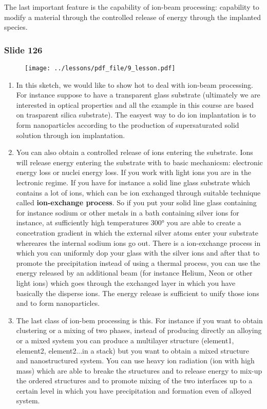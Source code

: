 \documentclass[../main/main.tex]{subfiles}
\begin{document}
The last important feature is the capability of ion-beam processing: capability to modify a material through the controlled release of energy through the implanted species.

\newpage

\subsubsection{Slide 126}

\begin{figure}[h!]
\centering
\texttt{[image: ../lessons/pdf\_file/9\_lesson.pdf]}
\end{figure}

\begin{enumerate}
\item In this sketch, we would like to show hot to deal with ion-beam processing. For instance suppose to have a transparent glass substrate (ultimately we are interested in optical properties and all the example in this course are based on trasparent silica substrate). The easyest way to do ion implantation is to form nanoparticles according to the production of supersaturated solid solution through ion implantation.

\item You can also obtain a controlled release of ions entering the substrate. Ions will release energy entering the substrate with to basic mechanicsm: electronic energy loss or nuclei energy loss. If you work with light ions you are in the lectronic regime. If you have for instance a solid line glass substrate which contains a lot of ions, which can be ion exchanged through suitable technique called \textbf{ion-exchange process}. So if you put your solid line glass containing for instance sodium or other metals in a bath containing silver ions for instance, at sufficiently high temperatures \( 300° \) you are able to create a concetration gradient in which the external silver atoms enter your substrate whereares the internal sodium ions go out.
There is a ion-exchange process in which you can uniformly dop your glass with the silver ions and after that to promote the precipitation instead of using a thermal process, you can use the energy released by an additional beam (for instance Helium, Neon or other light ions) which goes through the exchanged layer in which you have basically the disperse ions. The energy release is sufficient to unify those ions and to form nanoparticles.

\item The last class of ion-bem processing is this. For instance if you want to obtain clustering or a mixing of two phases, instead of producing directly an alloying or a mixed system you can produce a multilayer structure (element1, element2, element2...in a stack)  but you want to obtain a mixed structure and nanostructured system. You can use heavy ion radiation (ion with high mass) which are able to breake the structures and to release energy to mix-up the ordered structures and to promote mixing of the two interfaces up to a certain level in which you have precipitation and formation even of alloyed system.

\end{enumerate}
\end{document}
